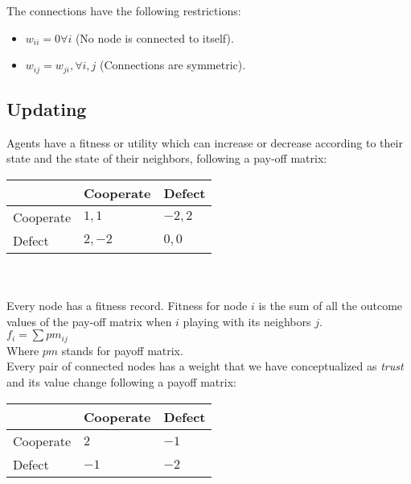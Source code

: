 \documentclass[11pt]{article} \usepackage{amsmath}
\begin{document}
The connections have the following restrictions:

\begin{itemize}

\item $w_{ii} = 0 \forall i$ (No node is connected to itself).

\item $w_{ij} = w_{ji}, \forall i,j$ (Connections are symmetric).

\end{itemize}


\subsection{Updating}

Agents have a fitness or utility which can increase or decrease according to their state and the state of their neighbors, following a pay-off matrix:\\


\begin{tabular}{| l | l | l |}
  \hline
  & Cooperate & Defect \\ \hline
  Cooperate & $1, 1$ & $-2, 2$   \\ \hline
  Defect    & $2, -2$& $0,0$   \\ \hline

\end{tabular}\\ \\

Every node has a fitness record. Fitness for node $i$ is the sum of all the outcome values of the pay-off matrix when $i$ playing with its neighbors $j$.\\

$f_{i} = \sum pm_{ij}$\\

Where $pm$ stands for payoff matrix.\\

Every pair of connected nodes has a weight that we have conceptualized as \textit{trust} and its value change following a payoff matrix:\\

\begin{tabular}{| l | l | l |}
  \hline
  & Cooperate & Defect \\ \hline
  Cooperate & $2$ & $-1$   \\ \hline
  Defect    & $-1$& $-2$   \\ \hline

\end{tabular}\\ \\
\end{document}
